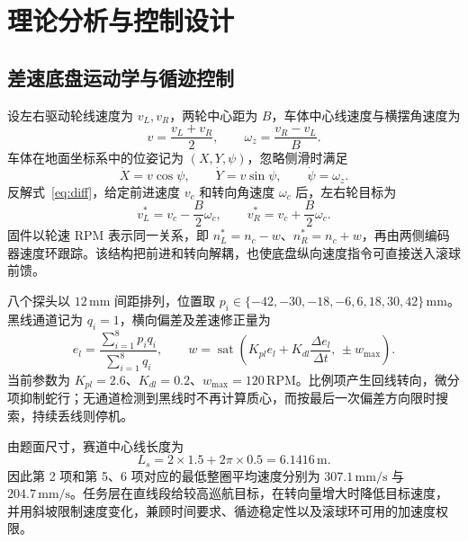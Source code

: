 \documentclass[12pt,a4paper]{ctexart}
\newcommand{\unit}[1]{\ensuremath{\,\mathrm{#1}}}
\begin{document}
\section{理论分析与控制设计}

\subsection{差速底盘运动学与循迹控制}

设左右驱动轮线速度为 $v_L,v_R$，两轮中心距为 $B$，车体中心线速度与横摆角速度为
\begin{equation}
 v=\frac{v_L+v_R}{2},\qquad
 \omega_z=\frac{v_R-v_L}{B}.
\label{eq:diff}
\end{equation}
车体在地面坐标系中的位姿记为 $(X,Y,\psi)$，忽略侧滑时满足
\begin{equation}
 \dot X=v\cos\psi,\qquad \dot Y=v\sin\psi,\qquad \dot\psi=\omega_z .
\label{eq:pose}
\end{equation}
反解式~\eqref{eq:diff}，给定前进速度 $v_c$ 和转向角速度 $\omega_c$ 后，左右轮目标为
\begin{equation}
 v_L^*=v_c-\frac{B}{2}\omega_c,\qquad
 v_R^*=v_c+\frac{B}{2}\omega_c .
\label{eq:mix}
\end{equation}
固件以轮速 RPM 表示同一关系，即 $n_L^*=n_c-w$、$n_R^*=n_c+w$，再由两侧编码器速度环跟踪。该结构把前进和转向解耦，也使底盘纵向速度指令可直接送入滚球前馈。

八个探头以 $12\unit{mm}$ 间距排列，位置取
$p_i\in\{-42,-30,-18,-6,6,18,30,42\}\unit{mm}$。黑线通道记为 $q_i=1$，横向偏差及差速修正量为
\begin{equation}
 e_l=\frac{\sum_{i=1}^{8}p_iq_i}{\sum_{i=1}^{8}q_i},\qquad
 w=\operatorname{sat}\!\left(K_{pl}e_l+K_{dl}\frac{\Delta e_l}{\Delta t},\,\pm w_{\max}\right).
\label{eq:line}
\end{equation}
当前参数为 $K_{pl}=2.6$、$K_{dl}=0.2$、$w_{\max}=120\unit{RPM}$。比例项产生回线转向，微分项抑制蛇行；无通道检测到黑线时不再计算质心，而按最后一次偏差方向限时搜索，持续丢线则停机。

由题面尺寸，赛道中心线长度为
\begin{equation}
 L_s=2\times1.5+2\pi\times0.5=6.1416\unit{m}.
\end{equation}
因此第 2 项和第 5、6 项对应的最低整圈平均速度分别为 $307.1\unit{mm/s}$ 与 $204.7\unit{mm/s}$。任务层在直线段给较高巡航目标，在转向量增大时降低目标速度，并用斜坡限制速度变化，兼顾时间要求、循迹稳定性以及滚球环可用的加速度权限。
\end{document}
